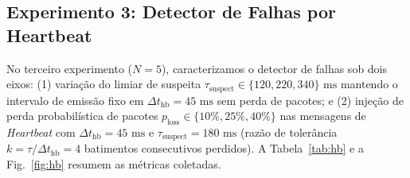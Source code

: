 \documentclass[conference,10pt]{IEEEtran}
\begin{document}
\subsection{Experimento 3: Detector de Falhas por Heartbeat}

No terceiro experimento ($N=5$), caracterizamos o detector de falhas sob dois eixos: (1) variação do limiar de suspeita $\tau_{\text{suspect}} \in \{120, 220, 340\}\text{ ms}$ mantendo o intervalo de emissão fixo em $\Delta t_{\text{hb}} = 45\text{ ms}$ sem perda de pacotes; e (2) injeção de perda probabilística de pacotes $p_{\text{loss}} \in \{10\%, 25\%, 40\%\}$ nas mensagens de \textit{Heartbeat} com $\Delta t_{\text{hb}} = 45\text{ ms}$ e $\tau_{\text{suspect}} = 180\text{ ms}$ (razão de tolerância $k = \tau/\Delta t_{\text{hb}} = 4$ batimentos consecutivos perdidos). A Tabela~\ref{tab:hb} e a Fig.~\ref{fig:hb} resumem as métricas coletadas.

\begin{table}[t]
\centering
\caption{Latência de Detecção, Falsos Positivos e Sobrecarga do Detector de Heartbeat ($N=5, \Delta t_{\text{hb}}=45\text{ ms}, R=5$)}
\label{tab:hb}
\end{table}
\end{document}
